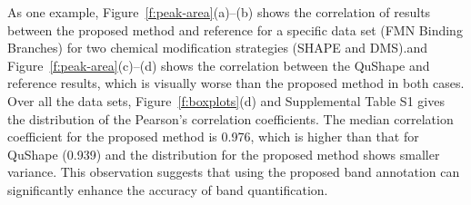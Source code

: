 As one example, Figure~\ref{f:peak-area}(a)--(b) shows the correlation of results between the proposed method and reference for a specific data set (FMN Binding Branches) for two chemical modification strategies (SHAPE and DMS).and Figure~\ref{f:peak-area}(c)--(d) shows the correlation between the QuShape and reference results, which is visually worse than the proposed method in both cases. Over all the data sets, Figure~\ref{f:boxplots}(d) and Supplemental Table S1 gives the distribution of the Pearson's correlation coefficients. The median correlation coefficient for the proposed method is 0.976, which is higher than that for QuShape (0.939) and the distribution for the proposed method shows smaller variance. This observation suggests that using the proposed band annotation can significantly enhance the accuracy of band quantification. 


